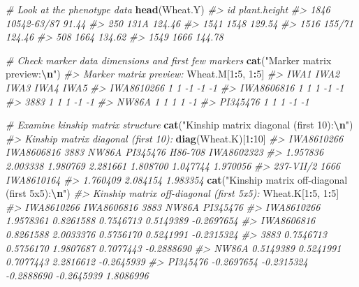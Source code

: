 \documentclass[
]{article}
\newenvironment{Shaded}{\begin{snugshade}}{\end{snugshade}}
\newcommand{\CommentTok}[1]{\textcolor[rgb]{0.56,0.35,0.01}{\textit{#1}}}
\newcommand{\DecValTok}[1]{\textcolor[rgb]{0.00,0.00,0.81}{#1}}
\newcommand{\FunctionTok}[1]{\textcolor[rgb]{0.13,0.29,0.53}{\textbf{#1}}}
\newcommand{\NormalTok}[1]{#1}
\newcommand{\SpecialCharTok}[1]{\textcolor[rgb]{0.81,0.36,0.00}{\textbf{#1}}}
\newcommand{\StringTok}[1]{\textcolor[rgb]{0.31,0.60,0.02}{#1}}
\begin{document}
\begin{Shaded}
\begin{Highlighting}[]
\CommentTok{\# Look at the phenotype data}
\FunctionTok{head}\NormalTok{(Wheat.Y)}
\CommentTok{\#\textgreater{}               id plant.height}
\CommentTok{\#\textgreater{} 1846 10542{-}63/87        91.44}
\CommentTok{\#\textgreater{} 250         131A       124.46}
\CommentTok{\#\textgreater{} 1541        1548       129.54}
\CommentTok{\#\textgreater{} 1516      155/71       124.46}
\CommentTok{\#\textgreater{} 508         1664       134.62}
\CommentTok{\#\textgreater{} 1549        1666       144.78}

\CommentTok{\# Check marker data dimensions and first few markers}
\FunctionTok{cat}\NormalTok{(}\StringTok{"Marker matrix preview:}\SpecialCharTok{\textbackslash{}n}\StringTok{"}\NormalTok{)}
\CommentTok{\#\textgreater{} Marker matrix preview:}
\NormalTok{Wheat.M[}\DecValTok{1}\SpecialCharTok{:}\DecValTok{5}\NormalTok{, }\DecValTok{1}\SpecialCharTok{:}\DecValTok{5}\NormalTok{]}
\CommentTok{\#\textgreater{}            IWA1 IWA2 IWA3 IWA4 IWA5}
\CommentTok{\#\textgreater{} IWA8610266    1    1   {-}1   {-}1   {-}1}
\CommentTok{\#\textgreater{} IWA8606816    1    1    1   {-}1   {-}1}
\CommentTok{\#\textgreater{} 3883          1    1    1   {-}1   {-}1}
\CommentTok{\#\textgreater{} NW86A         1    1    1    1   {-}1}
\CommentTok{\#\textgreater{} PI345476      1    1    1   {-}1   {-}1}

\CommentTok{\# Examine kinship matrix structure}
\FunctionTok{cat}\NormalTok{(}\StringTok{"Kinship matrix diagonal (first 10):}\SpecialCharTok{\textbackslash{}n}\StringTok{"}\NormalTok{)}
\CommentTok{\#\textgreater{} Kinship matrix diagonal (first 10):}
\FunctionTok{diag}\NormalTok{(Wheat.K)[}\DecValTok{1}\SpecialCharTok{:}\DecValTok{10}\NormalTok{]}
\CommentTok{\#\textgreater{} IWA8610266 IWA8606816       3883      NW86A   PI345476    H86{-}708 IWA8602323 }
\CommentTok{\#\textgreater{}   1.957836   2.003338   1.980769   2.281661   1.808700   1.047744   1.970056 }
\CommentTok{\#\textgreater{}  237{-}VII/2       1666 IWA8610164 }
\CommentTok{\#\textgreater{}   1.760409   2.084154   1.983354}
\FunctionTok{cat}\NormalTok{(}\StringTok{"Kinship matrix off{-}diagonal (first 5x5):}\SpecialCharTok{\textbackslash{}n}\StringTok{"}\NormalTok{)}
\CommentTok{\#\textgreater{} Kinship matrix off{-}diagonal (first 5x5):}
\NormalTok{Wheat.K[}\DecValTok{1}\SpecialCharTok{:}\DecValTok{5}\NormalTok{, }\DecValTok{1}\SpecialCharTok{:}\DecValTok{5}\NormalTok{]}
\CommentTok{\#\textgreater{}            IWA8610266 IWA8606816       3883      NW86A   PI345476}
\CommentTok{\#\textgreater{} IWA8610266  1.9578361  0.8261588  0.7546713  0.5149389 {-}0.2697654}
\CommentTok{\#\textgreater{} IWA8606816  0.8261588  2.0033376  0.5756170  0.5241991 {-}0.2315324}
\CommentTok{\#\textgreater{} 3883        0.7546713  0.5756170  1.9807687  0.7077443 {-}0.2888690}
\CommentTok{\#\textgreater{} NW86A       0.5149389  0.5241991  0.7077443  2.2816612 {-}0.2645939}
\CommentTok{\#\textgreater{} PI345476   {-}0.2697654 {-}0.2315324 {-}0.2888690 {-}0.2645939  1.8086996}
\end{Highlighting}
\end{Shaded}
\end{document}
